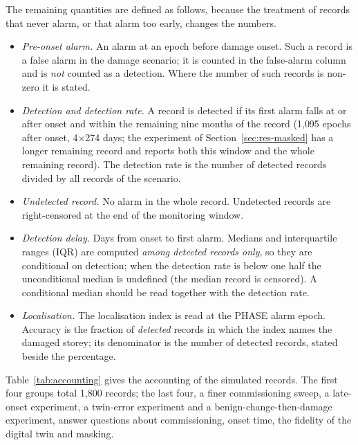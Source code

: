 \documentclass[12pt,a4paper]{article}
\newenvironment{revblock}{}{}
\newenvironment{revblock}{\begingroup\color{revcol}}{\endgroup}
\newcommand{\rtwo}[1]{#1}
\newcommand{\rtwo}[1]{{\color{revcolb}#1}}
\begin{document}
\begin{revblock}
The remaining quantities are defined as follows, because the treatment of records that never alarm, or that alarm too early, changes the numbers.
\begin{itemize}
\item \emph{Pre-onset alarm.} An alarm at an epoch before damage onset. Such a record is a false alarm in the damage scenario; it is counted in the false-alarm column and is \emph{not} counted as a detection. Where the number of such records is non-zero it is stated.
\item \rtwo{\emph{Detection and detection rate.} A record is detected if its first alarm falls at or after onset and within the remaining nine months of the record (1{,}095 epochs after onset, 4$\times$274 days; the experiment of Section~\ref{sec:res-masked} has a longer remaining record and reports both this window and the whole remaining record).} The detection rate is the number of detected records divided by all records of the scenario.
\item \emph{Undetected record.} No alarm in the whole record. Undetected records are right-censored at the end of the monitoring window.
\item \emph{Detection delay.} Days from onset to first alarm. Medians and interquartile ranges (IQR) are computed \emph{among detected records only}, so they are conditional on detection; when the detection rate is below one half the unconditional median is undefined (the median record is censored). A conditional median should be read together with the detection rate.
\item \emph{Localisation.} The localisation index is read at the PHASE alarm epoch. Accuracy is the fraction of \emph{detected} records in which the index names the damaged storey; its denominator is the number of detected records, stated beside the percentage.
\end{itemize}

Table~\ref{tab:accounting} gives the accounting of the simulated records. The first four groups total 1{,}800 records; the last four, a finer commissioning sweep, a late-onset experiment, a twin-error experiment and a benign-change-then-damage experiment, answer questions about commissioning, onset time, the fidelity of the digital twin and masking.


\end{revblock}
\end{document}
